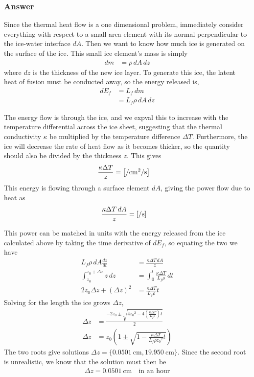 \subsubsection{Answer}

Since the thermal heat flow is a one dimensional problem, immediately
consider everything with respect to a small area element with its normal
perpendicular to the ice-water interface $dA$. Then we want to know how much
ice is generated on the surface of the ice. This small ice element's mass is
simply
\begin{align*}
    dm &= \rho \,dA\,dz
\end{align*}
where $dz$ is the thickness of the new ice layer. To generate this ice, the
latent heat of fusion must be conducted away, so the energy released is,
\begin{align*}
    dE_f &= L_f\,dm \\
    {} &= L_f \rho  \,dA\,dz
\end{align*}

The energy flow is through the ice, and we expval this to increase with the
temperature differential across the ice sheet, suggesting that the thermal
conductivity $\kappa $ be multiplied by the temperature difference $\Delta T$. Furthermore,
the ice will decrease the rate of heat flow as it becomes thicker, so the
quantity should also be divided by the thickness $z$. This gives
\begin{align*}
    \frac{\kappa  \Delta T}{z} &= \left[ \si{\cal\per\cm\squared\per\s}
	\right]
\end{align*}
This energy is flowing through a surface element $dA$, giving the power flow
due to heat as
\begin{align*}
    \frac{\kappa \Delta T\,dA}{z} &= \left[ \si{\cal\per\s} \right]
\end{align*}

This power can be matched in units with the energy released from the ice
calculated above by taking the time derivative of $dE_f$, so equating the two
we have
\begin{align*}
    L_f \rho  \,dA\frac{dz}{dt} &= \frac{\kappa \Delta T\,dA}{z} \\
    \int_{z_0}^{z_0+\Delta z} z\,dz &= \int_0^t \frac{\kappa \Delta T}{L_f \rho }\,dt \\
    2z_0 \Delta z + (\Delta z)^2 &= \frac{\kappa \Delta T}{L_f \rho }t
\end{align*}
Solving for the length the ice grows $\Delta z$,
\begin{align*}
    \Delta z &= \frac{-2z_0 \pm \sqrt{4{z_0}^2 - 4(\frac{\kappa \Delta T}{L_f \rho })t} }{2} \\
    \Delta z &= z_0(1 \pm \sqrt{1 - \frac{\kappa \Delta T}{L_f \rho  {z_0}^2} t})
\end{align*}
The two roots give solutions $\Delta z = \{ \SI{0.0501}{\cm}, \SI{19.950}{\cm} \}$.
Since the second root is unrealistic, we know that the solution must then be
\begin{align}
    \boxed{
    \Delta z = \SI{0.0501}{\cm} \quad\text{in an hour}
    }
\end{align}


